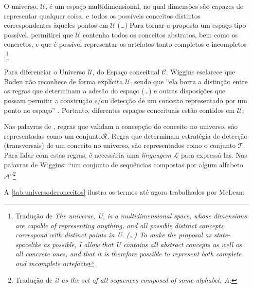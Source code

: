 \begin{citacao}
O universo, $\mathcal{U}$, é um espaço multidimensional, no qual dimensões são capazes de representar qualquer coisa, e todos os possíveis conceitos distintos correspondentes àqueles pontos em $\mathcal{U}$ (\ldots) Para tornar a proposta um espaço-tipo possível, permitirei que $\mathcal{U}$ contenha todos os conceitos abstratos, bem como os concretos, e que é possível representar os artefatos tanto completos e incompletos \cite[p.~451]{wiggins_framework_2006}.\footnote{Tradução de \emph{The universe, U, is a multidimensional space, whose dimensions are capable of representing anything, and all possible distinct concepts correspond with distinct points in U. (\ldots) To make the proposal as state-spacelike as possible, I allow that U contains all abstract concepts as well as all concrete ones, and that it is therefore possible to represent both complete and incomplete artefacts}}
\end{citacao}

Para diferenciar o Universo $\mathcal{U}$, do Espaço conceitual $\mathcal{C}$, Wiggins esclarece que Boden não reconhece de forma explícita $\mathcal{U}$, sendo que ``ela borra a distinção entre as regras que determinam a adesão do espaço (\ldots) e outras disposições que possam permitir a construção e/ou detecção de um conceito representado por um ponto no espaço'' \cite[p.~451]{wiggins_framework_2006}. Portanto, diferentes espaços conceituais estão contidos em $\mathcal{U}$;

Nas palavras de , regras que validam a concepção do conceito no universo, são representadas como um conjunto$\mathcal{R}$. Regra que determinam estratégia de detecção (transversais) de um conceito no universo, são representados como o conjunto $\mathcal{T}$. Para lidar com estas regras, é necessária uma \emph{linguagem} $\mathcal{L}$ para expressá-las. Nas palavras de Wiggins: ``um conjunto de sequências compostas por algum alfabeto $\mathcal{A}$''\footnote{Tradução de \emph{it as the set of all sequences composed of some alphabet, A.}}

A \autoref{tab:universodeconceitos} ilustra os termos até agora trabalhados por McLean:


